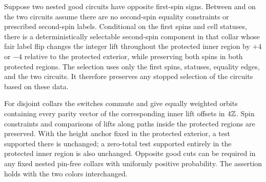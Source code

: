 \begin{lemma}\label{lem:collar-switch}
Suppose two nested good circuits have opposite first-spin signs. Between
and on the two circuits assume there are no second-spin equality
constraints or prescribed second-spin labels. Conditional on the
first spins and cell statuses, there is a deterministically selectable
second-spin component in that collar whose fair label flip changes the
integer lift throughout the protected inner region by $+4$ or $-4$
relative to the protected exterior, while preserving both spins in both
protected regions. The selection uses only the first spins, statuses,
equality edges, and the two circuits. It therefore preserves any stopped
selection of the circuits based on these data.

For disjoint collars the switches commute and give equally weighted
orbits containing every parity vector of the corresponding inner lift
offsets in $4\mathbb Z$. Spin constraints and comparisons of lifts along paths
inside the protected regions are preserved. With the height anchor fixed
in the protected exterior, a test supported there is unchanged; a
zero-total test supported entirely in the protected inner region is also
unchanged. Opposite good cuts can be required in any
fixed nested pin-free collars with uniformly positive probability.
The assertion holds with the two colors interchanged.
\end{lemma}
